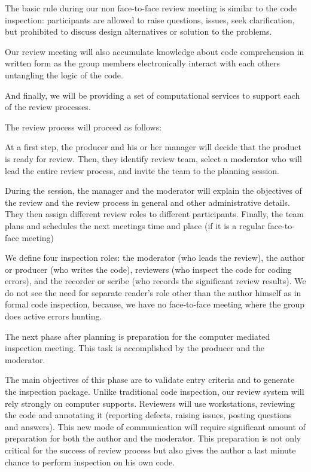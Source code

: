 The basic rule during our non face-to-face review
meeting is similar to the code inspection:
participants are allowed to
raise questions, issues, seek clarification, but 
prohibited to discuss
design alternatives or solution to the problems.

Our review meeting will also accumulate 
knowledge about code comprehension in written form as the group members
electronically interact with each others untangling the logic of the code. 

And finally, we will be providing a set of computational services to  support
each of the review processes.


\noindent The review process will proceed as follows:


At a first step, the producer and his or her manager will decide that
the product is ready for review. Then, they identify review team,
select a moderator who will lead the entire review process, and
invite the team to the planning session.

During the session, the manager and the moderator
will explain the objectives of the review and the review process
in general and other administrative details. They then assign
different review roles to different participants.
Finally, the team plans and schedules the next meetings time and place
(if it is a regular face-to-face meeting)

We define four inspection roles: the moderator (who leads the review),
the author or producer (who writes the code), reviewers (who
inspect the code for coding errors), and the recorder or scribe
(who records the significant review results).
We do not see the need for separate reader's role other than
the author himself as in formal code inspection, because, 
we have no face-to-face meeting where the group does active
errors hunting.



The next phase after planning is preparation for the computer mediated
inspection meeting.  This task 
is accomplished by the producer and the moderator.

The main objectives of this phase are to validate entry criteria and
to  generate the  inspection package.
Unlike traditional code inspection, our review system will rely strongly
on computer supports. Reviewers will use workstations,
reviewing the code and annotating it (reporting defects, raising issues,
posting questions and answers). 
This new mode of communication will require significant amount of preparation
for both the author and the moderator.
This preparation is not only critical for the success of review process
but also gives the author a last minute chance to perform 
inspection on his own code.

